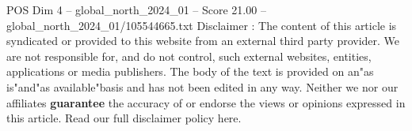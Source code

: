 \begin{textsample}{POS Dim 4 – global\_north\_2024\_01 – Score 21.00 – global\_north\_2024\_01/105544665.txt}
Disclaimer : The content of this article is syndicated or provided to this website from an external third party provider.
We are not responsible for, and do not control, such external websites, entities, applications or media publishers.
The body of the text is provided on an"as is"and"as available"basis and has not been edited in any way.
Neither we nor our affiliates \textbf{guarantee} the accuracy of or endorse the views or opinions expressed in this article.
Read our full disclaimer policy here.

\end{textsample}
